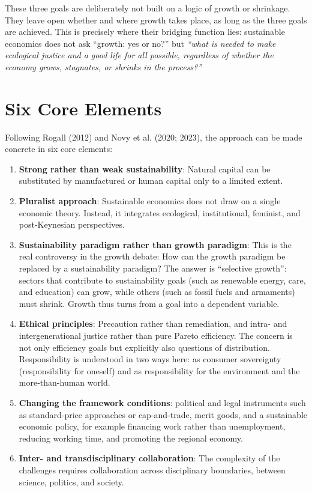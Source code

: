 \documentclass[
  british,
  a4paper,
  DIV=11,
  numbers=noendperiod,
  oneside,
  openany]{scrreprt}
\begin{document}
These three goals are deliberately not built on a logic of growth or
shrinkage. They leave open whether and where growth takes place, as long
as the three goals are achieved. This is precisely where their bridging
function lies: sustainable economics does not ask ``growth: yes or no?''
but \emph{``what is needed to make ecological justice and a good life
for all possible, regardless of whether the economy grows, stagnates, or
shrinks in the process?''}

\section{Six Core Elements}\label{six-core-elements}

Following Rogall (2012) and Novy et al. (2020; 2023), the approach can
be made concrete in six core elements:

\begin{enumerate}
\def\labelenumi{\arabic{enumi}.}
\item
  \textbf{Strong rather than weak sustainability}: Natural capital can
  be substituted by manufactured or human capital only to a limited
  extent.
\item
  \textbf{Pluralist approach}: Sustainable economics does not draw on a
  single economic theory. Instead, it integrates ecological,
  institutional, feminist, and post-Keynesian perspectives.
\item
  \textbf{Sustainability paradigm rather than growth paradigm}: This is
  the real controversy in the growth debate: How can the growth paradigm
  be replaced by a sustainability paradigm? The answer is ``selective
  growth'': sectors that contribute to sustainability goals (such as
  renewable energy, care, and education) can grow, while others (such as
  fossil fuels and armaments) must shrink. Growth thus turns from a goal
  into a dependent variable.
\item
  \textbf{Ethical principles}: Precaution rather than remediation, and
  intra- and intergenerational justice rather than pure Pareto
  efficiency. The concern is not only efficiency goals but explicitly
  also questions of distribution. Responsibility is understood in two
  ways here: as consumer sovereignty (responsibility for oneself) and as
  responsibility for the environment and the more-than-human world.
\item
  \textbf{Changing the framework conditions}: political and legal
  instruments such as standard-price approaches or cap-and-trade, merit
  goods, and a sustainable economic policy, for example financing work
  rather than unemployment, reducing working time, and promoting the
  regional economy.
\item
  \textbf{Inter- and transdisciplinary collaboration}: The complexity of
  the challenges requires collaboration across disciplinary boundaries,
  between science, politics, and society.
\end{enumerate}
\end{document}
